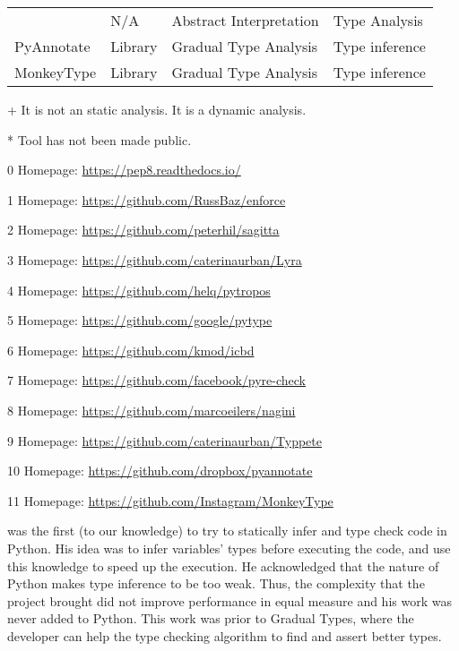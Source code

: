 \begin{sidewaystable}[p]
\begin{threeparttable}
\begin{longtable}[]{|l|l|l|l|}
    \textcite{monat_static_2018}\tnote{*}                & N/A     & Abstract Interpretation & Type Analysis               \tabularnewline
    PyAnnotate\tnote{+}\tnote{10}                        & Library & Gradual Type Analysis   & Type inference              \tabularnewline
    MonkeyType\tnote{+}\tnote{11}                        & Library & Gradual Type Analysis   & Type inference              \tabularnewline
  \bottomrule
\end{longtable}
\begin{tablenotes}
  \item[+] \footnotesize It is not an static analysis. It is a dynamic analysis.
  \item[*] Tool has not been made public.
  \item[0] Homepage: \url{https://pep8.readthedocs.io/}
  \item[1] Homepage: \url{https://github.com/RussBaz/enforce}
  \item[2] Homepage: \url{https://github.com/peterhil/sagitta}
  \item[3] Homepage: \url{https://github.com/caterinaurban/Lyra}
  \item[4] Homepage: \url{https://github.com/helq/pytropos}
  \item[5] Homepage: \url{https://github.com/google/pytype}
  \item[6] Homepage: \url{https://github.com/kmod/icbd}
  \item[7] Homepage: \url{https://github.com/facebook/pyre-check}
  \item[8] Homepage: \url{https://github.com/marcoeilers/nagini}
  \item[9] Homepage: \url{https://github.com/caterinaurban/Typpete}
  \item[10] Homepage: \url{https://github.com/dropbox/pyannotate}
  \item[11] Homepage: \url{https://github.com/Instagram/MonkeyType}
\end{tablenotes}
\end{threeparttable}
\end{sidewaystable}

\textcite{cannon_localized_2005} was the first (to our knowledge) to try to statically
infer and type check code in Python. His idea was to infer variables' types before
executing the code, and use this knowledge to speed up the execution. He acknowledged that
the nature of Python makes type inference to be too weak. Thus, the complexity that the
project brought did not improve performance in equal measure and his work was never added
to Python. This work was prior to \textcite{siek_gradual_2006} Gradual Types, where the
developer can help the type checking algorithm to find and assert better types.

